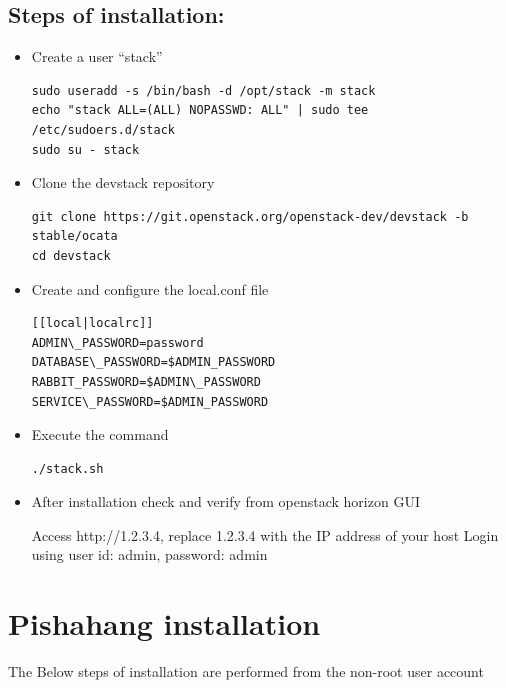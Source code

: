 	\subsection*{Steps of installation:}
	\begin{itemize}
		\item Create a user “stack”
		\begin{lstlisting}
sudo useradd -s /bin/bash -d /opt/stack -m stack
echo "stack ALL=(ALL) NOPASSWD: ALL" | sudo tee /etc/sudoers.d/stack
sudo su - stack
		\end{lstlisting}
		
		\item Clone the devstack repository
		\begin{lstlisting}
git clone https://git.openstack.org/openstack-dev/devstack -b stable/ocata
cd devstack
		\end{lstlisting}
		\newpage
		\item Create and configure the local.conf file\\
		\begin{lstlisting}
[[local|localrc]]
ADMIN\_PASSWORD=password
DATABASE\_PASSWORD=$ADMIN_PASSWORD
RABBIT_PASSWORD=$ADMIN\_PASSWORD
SERVICE\_PASSWORD=$ADMIN_PASSWORD 	
		\end{lstlisting}
		
		
		\item Execute the command
		\begin{lstlisting}
./stack.sh
		\end{lstlisting}
		
		\item After installation check and verify from openstack horizon GUI
		
		Access http://1.2.3.4, replace 1.2.3.4 with the IP address of your host
		Login using user id: admin, password: admin
	\end{itemize}
	
	\section{Pishahang installation}
	\label{sec:Pishahang installation}
	The Below steps of installation are performed from the non-root user account
	
